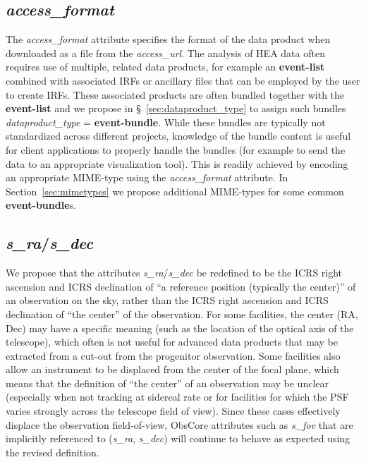 \documentclass[11pt,a4paper]{ivoa}
\begin{document}
\subsection{{\em access\_format}}

The {\em access\_format\/} attribute specifies the format of the data product when downloaded as a file from the {\em access\_url\/}.  The analysis of \gls{HEA} data often requires use of multiple, related data products, for example an {\bf event-list} combined with associated \glspl{IRF} or ancillary files that can be employed by the user to create \glspl{IRF}\null.  These associated products are often bundled together with the {\bf event-list} and we propose in \S~\ref{sec:dataproduct_type} to assign such bundles {\em dataproduct\_type\/} = {\bf event-bundle}.  While these bundles are typically not standardized across different projects, knowledge of the bundle content is useful for client applications to properly handle the bundles (for example to send the data to an appropriate visualization tool).  This is readily achieved by encoding an appropriate MIME-type using the {\em access\_format\/} attribute.  In Section~\ref{sec:mimetypes} we propose additional MIME-types for some common {\bf event-bundle}s.

\subsection{{\em s\_ra\/}/{\em s\_dec}}

We propose that the attributes {\em s\_ra\/}/{\em s\_dec\/} be redefined to be the ICRS right ascension and ICRS declination of ``a reference position (typically the center)'' of an observation on the sky, rather than the ICRS right ascension and ICRS declination of ``the center'' of the observation.  For some facilities, the center (RA, Dec) may have a specific meaning (such as the location of the optical axis of the telescope), which often is not useful for advanced data products that may be extracted from a cut-out from the progenitor observation.  Some facilities also allow an instrument to be displaced from the center of the focal plane, which means that the definition of ``the center'' of an observation may be unclear (especially when not tracking at sidereal rate or for facilities for which the PSF varies strongly across the telescope field of view).  Since these cases effectively displace the observation field-of-view, ObsCore attributes such as {\em s\_fov\/} that are implicitly referenced to ({\em s\_ra\/}, {\em s\_dec\/}) will continue to behave as expected using the revised definition.
\end{document}
